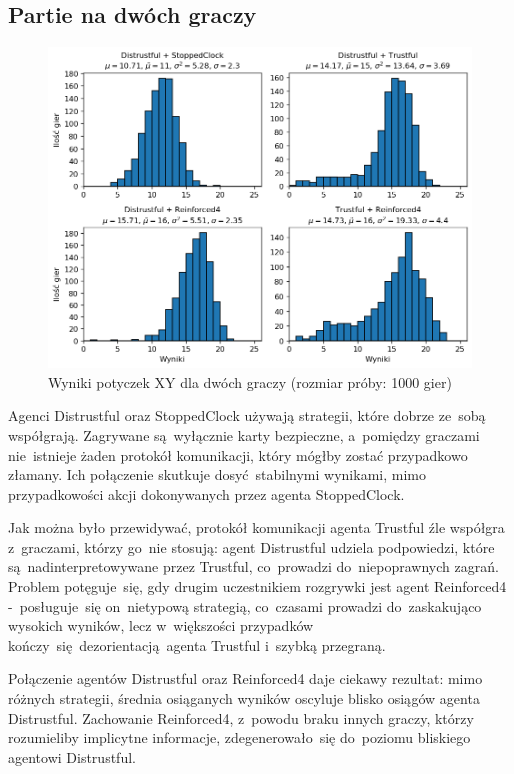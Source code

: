 \documentclass[declaration,shortabstract,inz]{iithesis}
\begin{document}
\subsection*{Partie na dwóch graczy}

\begin{figure}[H]
	\centering
	\captionsetup{format=hang}
	\includegraphics[width=\textwidth,height=\textheight,keepaspectratio]{XY2.png}
	\caption[Caption]{Wyniki potyczek XY dla dwóch graczy (rozmiar próby: 1000 gier)}
	\label{fig:XY2}
\end{figure}

Agenci Distrustful oraz StoppedClock używają strategii, które dobrze ze~sobą współgrają. Zagrywane są~wyłącznie karty bezpieczne, a~pomiędzy graczami nie~istnieje żaden protokół komunikacji, który mógłby zostać przypadkowo złamany. Ich połączenie skutkuje dosyć stabilnymi wynikami, mimo przypadkowości akcji dokonywanych przez agenta StoppedClock.

Jak można było przewidywać, protokół komunikacji agenta Trustful źle współgra z~graczami, którzy go~nie stosują: agent Distrustful udziela podpowiedzi, które są~nadinterpretowywane przez Trustful, co~prowadzi do~niepoprawnych zagrań. Problem potęguje~się, gdy drugim uczestnikiem rozgrywki jest agent Reinforced4 -~posługuje~się on~nietypową strategią, co~czasami prowadzi do~zaskakująco wysokich wyników, lecz w~większości przypadków kończy~się dezorientacją agenta Trustful i~szybką przegraną.

Połączenie agentów Distrustful oraz Reinforced4 daje ciekawy rezultat: mimo różnych strategii, średnia osiąganych wyników oscyluje blisko osiągów agenta Distrustful. Zachowanie Reinforced4, z~powodu braku innych graczy, którzy rozumieliby implicytne informacje, zdegenerowało~się do~poziomu bliskiego agentowi Distrustful.
\end{document}
